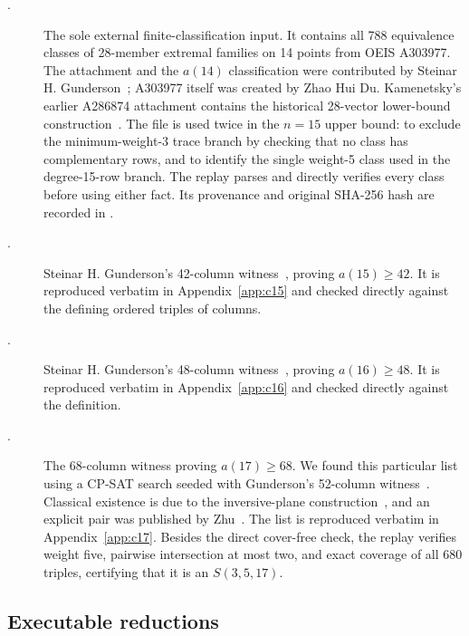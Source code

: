 \documentclass[11pt]{article}
\begin{document}
\begin{description}
 \item[.]
 The sole external finite-classification input.  It contains all 788
 equivalence classes of 28-member extremal families on 14 points from OEIS
 A303977.  The attachment and the $a(14)$ classification were contributed by
 Steinar H. Gunderson~\cite{oeis-a303977}; A303977 itself was created by Zhao
 Hui Du.  Kamenetsky's earlier A286874 attachment contains the historical
 28-vector lower-bound construction~\cite{kamenetsky-a286874}.  The file is
 used twice in the $n=15$ upper bound: to exclude the
 minimum-weight-3 trace branch by checking that no class has complementary
 rows, and to identify the single weight-5 class used in the degree-15-row
 branch.  The replay parses and directly verifies every class before using
 either fact.  Its provenance and original SHA-256 hash are recorded in
 .

 \item[.]
 Steinar H. Gunderson's 42-column witness~\cite{gunderson-a286874}, proving
 $a(15)\geq42$.  It is reproduced verbatim in Appendix~\ref{app:c15} and
 checked directly against the defining ordered triples of columns.

 \item[.]
 Steinar H. Gunderson's 48-column witness~\cite{gunderson-a286874}, proving
 $a(16)\geq48$.  It is reproduced verbatim in Appendix~\ref{app:c16} and
 checked directly against the definition.

 \item[.]
 The 68-column witness proving $a(17)\geq68$.  We found this particular list
 using a CP-SAT search seeded with Gunderson's 52-column
 witness~\cite{gunderson-a286874}.  Classical
 existence is due to the inversive-plane construction~\cite{phelps1981}, and
 an explicit pair was published by Zhu~\cite{zhu1980}.  The list is reproduced
 verbatim in Appendix~\ref{app:c17}.  Besides the direct cover-free check, the replay
 verifies weight five, pairwise intersection at most two, and exact coverage
 of all 680 triples, certifying that it is an $S(3,5,17)$.
\end{description}

\subsection{Executable reductions}
\end{document}
